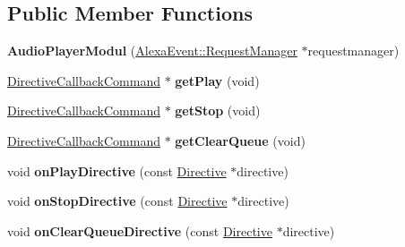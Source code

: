 \subsection*{Public Member Functions}
\begin{DoxyCompactItemize}
\item 
\mbox{\label{classdirective_1_1AudioPlayerModul_a15aa9c80a5f24d85cdd1f11547b4042d}} 
{\bfseries Audio\+Player\+Modul} (\hyperlink{classAlexaEvent_1_1RequestManager}{Alexa\+Event\+::\+Request\+Manager} $\ast$requestmanager)
\item 
\mbox{\label{classdirective_1_1AudioPlayerModul_a7a77362504dfeffa4425dc3858b11635}} 
\hyperlink{classdirective_1_1DirectiveCallbackCommand}{Directive\+Callback\+Command} $\ast$ {\bfseries get\+Play} (void)
\item 
\mbox{\label{classdirective_1_1AudioPlayerModul_a2a969306c4220256247a24ef61ead10c}} 
\hyperlink{classdirective_1_1DirectiveCallbackCommand}{Directive\+Callback\+Command} $\ast$ {\bfseries get\+Stop} (void)
\item 
\mbox{\label{classdirective_1_1AudioPlayerModul_aba727967f55c991e74764bd6ce413a24}} 
\hyperlink{classdirective_1_1DirectiveCallbackCommand}{Directive\+Callback\+Command} $\ast$ {\bfseries get\+Clear\+Queue} (void)
\item 
\mbox{\label{classdirective_1_1AudioPlayerModul_a634a37edb98f8c263e934ee2b2b1375c}} 
void {\bfseries on\+Play\+Directive} (const \hyperlink{classdirective_1_1Directive}{Directive} $\ast$directive)
\item 
\mbox{\label{classdirective_1_1AudioPlayerModul_ad2bd8f34c64df834541648d7cc1dddbe}} 
void {\bfseries on\+Stop\+Directive} (const \hyperlink{classdirective_1_1Directive}{Directive} $\ast$directive)
\item 
\mbox{\label{classdirective_1_1AudioPlayerModul_a2c7b7b1496eda31f9c5f059b48ba074c}} 
void {\bfseries on\+Clear\+Queue\+Directive} (const \hyperlink{classdirective_1_1Directive}{Directive} $\ast$directive)
\end{DoxyCompactItemize}
